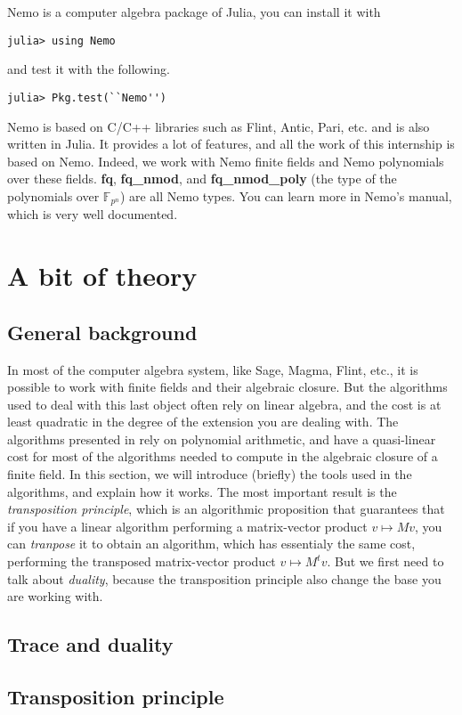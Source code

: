 \documentclass[a4paper,11pt]{article}
\theoremstyle{break}
\theoremstyle{definition}
\theoremstyle{remark}
\begin{document}
Nemo is a computer algebra package of Julia, you can install it with 
\begin{verbatim}
julia> using Nemo
\end{verbatim}
and test it with the following.
\begin{verbatim}
julia> Pkg.test(``Nemo'')
\end{verbatim}
Nemo is based on C/C++ libraries such as Flint, Antic, Pari, etc. and is also
written in Julia. It provides a lot of features, and all the work of this
internship is based on Nemo. Indeed, we work with Nemo finite fields and Nemo
polynomials over these fields. \textbf{fq}, \textbf{fq\_nmod}, and
\textbf{fq\_nmod\_poly} (the type of the polynomials over $\mathbb{F}_{p^n}$) are
all Nemo types. You can learn more in Nemo's manual, which is very well
documented.

\section{A bit of theory}
\subsection{General background}
In most of the computer algebra system, like Sage, Magma, Flint, etc., it is possible to work with finite
fields and their algebraic closure. But the algorithms used to deal with this
last object often rely on linear algebra, and the cost is at least quadratic in
the degree of the extension you are dealing with. The algorithms presented in
\cite{DDS14} rely on polynomial arithmetic, and have a quasi-linear cost for most of the algorithms needed to
compute in the algebraic closure of a finite field. In this section, we will
introduce (briefly) the tools used in the algorithms, and explain how it works.
The most important result is the \emph{transposition principle}, which is an
algorithmic proposition that guarantees that if you have a linear algorithm
performing a matrix-vector product $v\mapsto Mv$, you can \emph{tranpose} it to
obtain an algorithm, which has essentialy the same cost, performing the transposed matrix-vector product $v\mapsto
M^tv$. But we first need to talk about \emph{duality}, because the transposition
principle also change the base you are working with.
\subsection{Trace and duality}
\subsection{Transposition principle}
\end{document}
